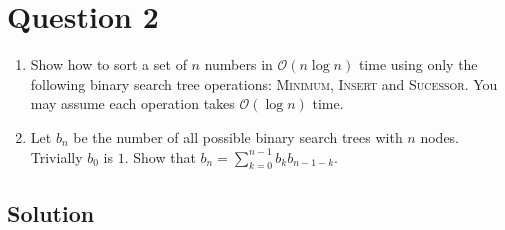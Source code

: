 
\section*{Question 2}

\begin{enumerate}[label=(\alph*)]
\item Show how to sort a set of $n$ numbers in $\mathcal{O}(n\log n)$ time using only the following binary search tree operations: \textsc{Minimum}, \textsc{Insert} and \textsc{Sucessor}. You may assume each operation takes $\mathcal{O}(\log n)$ time.

\item Let $b_n$ be the number of all possible binary search trees with $n$ nodes. Trivially $b_0$ is $1$. Show that $b_n = \sum_{k=0}^{n-1} b_k b_{n-1-k}$.
\end{enumerate}

\subsection*{Solution}

